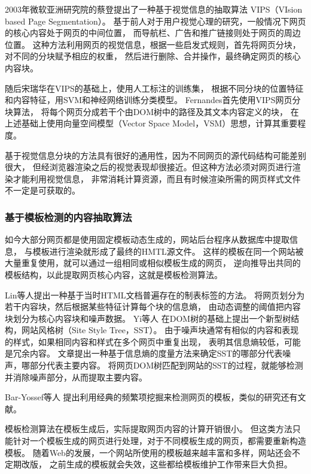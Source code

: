 2003年微软亚洲研究院的蔡登提出了一种基于视觉信息的抽取算法
VIPS（VIsion based Page Segmentation）。
基于前人对于用户视觉心理的研究，一般情况下网页的核心内容处于网页的中间位置，
而导航栏、广告和推广链接则处于网页的周边位置。
这种方法利用网页的视觉信息，根据一些启发式规则，首先将网页分块，对不同的分块赋予相应的权重，
然后进行删除、合并操作，最终确定网页的核心内容块。

随后宋瑞华在VIPS的基础上，使用人工标注的训练集，
根据不同分块的位置特征和内容特征，用SVM和神经网络训练分类模型。
Fernandes首先使用VIPS网页分块算法，
将每个网页分成若干个由DOM树中的路径及其文本内容定义的块，
在上述基础上使用向量空间模型（Vector Space Model，VSM）思想，计算其重要程度。

基于视觉信息分块的方法具有很好的通用性，因为不同网页的源代码结构可能差别很大，
但经浏览器渲染之后的视觉表现却很接近。但这种方法必须对网页进行渲染才能利用视觉信息，
非常消耗计算资源，而且有时候渲染所需的网页样式文件不一定是可获取的。

\subsubsection{基于模板检测的内容抽取算法}

如今大部分网页都是使用固定模板动态生成的，网站后台程序从数据库中提取信息，
与模板进行渲染就形成了最终的HMTL源文件。
这样的模板在同一个网站被大量重复使用，就可以通过一组相同或相似模板生成的网页，
逆向推导出共同的模板结构，以此提取网页核心内容，这就是模板检测算法。

Lin等人提出一种基于当时HTML文档普遍存在的制表标签的方法。
将网页划分为若干内容块，然后根据某些特征计算每个块的信息熵，
由动态调整的阈值把内容块划分为核心内容块和噪声数据。
Yi等人
在DOM树的基础上提出一个新型树结构，网站风格树（Site Style Tree，SST）。
由于噪声块通常有相似的内容和表现的样式，如果相同内容和样式在多个网页中重复出现，
表明其信息熵较低，可能是冗余内容。
文章提出一种基于信息熵的度量方法来确定SST的哪部分代表噪声，哪部分代表主要内容。
将网页DOM树匹配到网站的SST的过程，就能够检测并消除噪声部分，从而提取主要内容。

Bar-Yossef等人
提出利用经典的频繁项挖掘来检测网页的模板，类似的研究还有文献\cite{chen2006template}。

模板检测算法在模板生成后，实际提取网页内容的计算开销很小。
但这类方法只能针对一个模板生成的网页进行处理，对于不同模板生成的网页，都需要重新构造模板。
随着Web的发展，一个网站所使用的模板越来越丰富和多样，网站还会不定期改版，
之前生成的模板就会失效，这些都给模板维护工作带来巨大负担。

